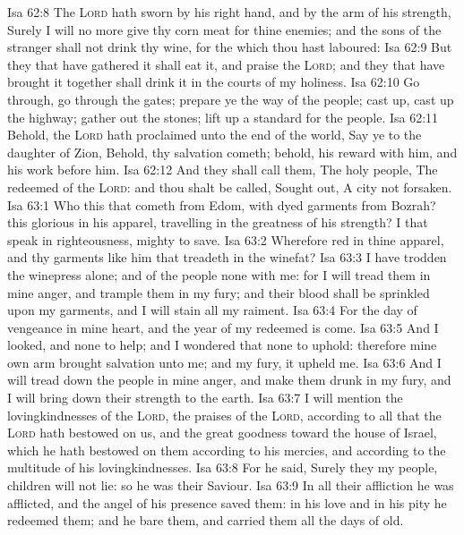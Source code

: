 \vs Isa 62:8 The \textsc{Lord} hath sworn by his right hand, and by the arm of his strength, Surely I will no more give thy corn  meat for thine enemies; and the sons of the stranger shall not drink thy wine, for the which thou hast laboured:
\vs Isa 62:9 But they that have gathered it shall eat it, and praise the \textsc{Lord}; and they that have brought it together shall drink it in the courts of my holiness.
\vs Isa 62:10 Go through, go through the gates; prepare ye the way of the people; cast up, cast up the highway; gather out the stones; lift up a standard for the people.
\vs Isa 62:11 Behold, the \textsc{Lord} hath proclaimed unto the end of the world, Say ye to the daughter of Zion, Behold, thy salvation cometh; behold, his reward  with him, and his work before him.
\vs Isa 62:12 And they shall call them, The holy people, The redeemed of the \textsc{Lord}: and thou shalt be called, Sought out, A city not forsaken.
\vs Isa 63:1 Who  this that cometh from Edom, with dyed garments from Bozrah? this  glorious in his apparel, travelling in the greatness of his strength? I that speak in righteousness, mighty to save.
\vs Isa 63:2 Wherefore  red in thine apparel, and thy garments like him that treadeth in the winefat?
\vs Isa 63:3 I have trodden the winepress alone; and of the people  none with me: for I will tread them in mine anger, and trample them in my fury; and their blood shall be sprinkled upon my garments, and I will stain all my raiment.
\vs Isa 63:4 For the day of vengeance  in mine heart, and the year of my redeemed is come.
\vs Isa 63:5 And I looked, and  none to help; and I wondered that  none to uphold: therefore mine own arm brought salvation unto me; and my fury, it upheld me.
\vs Isa 63:6 And I will tread down the people in mine anger, and make them drunk in my fury, and I will bring down their strength to the earth.
\vs Isa 63:7 I will mention the lovingkindnesses of the \textsc{Lord},  the praises of the \textsc{Lord}, according to all that the \textsc{Lord} hath bestowed on us, and the great goodness toward the house of Israel, which he hath bestowed on them according to his mercies, and according to the multitude of his lovingkindnesses.
\vs Isa 63:8 For he said, Surely they  my people, children  will not lie: so he was their Saviour.
\vs Isa 63:9 In all their affliction he was afflicted, and the angel of his presence saved them: in his love and in his pity he redeemed them; and he bare them, and carried them all the days of old.
